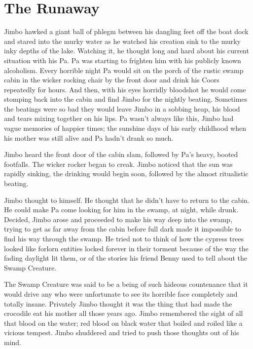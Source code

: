 \chapter{The Runaway}






Jimbo hawked a giant ball of phlegm between his dangling feet off
the boat dock and stared into the murky water as he watched his
creation sink to the murky inky depths of the lake. Watching it, he
thought long and hard about his current situation with his Pa. Pa
was starting to frighten him with his publicly known alcoholism.
Every horrible night Pa would sit on the porch of the rustic swamp
cabin in the wicker rocking chair by the front door and drink his
Coors repeatedly for hours. And then, with his eyes horridly
bloodshot he would come stomping back into the cabin and find Jimbo
for the nightly beating. Sometimes the beatings were so bad they
would leave Jimbo in a sobbing heap, his blood and tears mixing
together on his lips. Pa wasn't always like this, Jimbo had
vague memories of happier times; the sunshine days of his early
childhood when his mother was still alive and Pa hadn't drank
so much.

Jimbo heard the front door of the cabin slam, followed by
Pa's heavy, booted footfalls. The wicker rocker began to
creak. Jimbo noticed that the sun was rapidly sinking, the drinking
would begin soon, followed by the almost ritualistic beating.

Jimbo thought to himself. He thought that he didn't have to
return to the cabin. He could make Pa come looking for him in the
swamp, at night, while drunk. Decided, Jimbo arose and proceeded to
make his way deep into the swamp, trying to get as far away from
the cabin before full dark made it impossible to find his way
through the swamp. He tried not to think of how the cypress trees
looked like forlorn entities locked forever in their torment
because of the way the fading daylight lit them, or of the stories
his friend Benny used to tell about the Swamp Creature.

The Swamp Creature was said to be a being of such hideous
countenance that it would drive any who were unfortunate to see its
horrible face completely and totally insane. Privately Jimbo
thought it was the thing that had made the crocodile eat his mother
all those years ago. Jimbo remembered the sight of all that blood
on the water; red blood on black water that boiled and roiled like
a vicious tempest. Jimbo shuddered and tried to push those thoughts
out of his mind.

